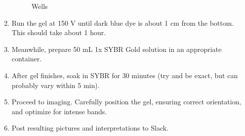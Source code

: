 \documentclass[letterpaper]{article}
\begin{document}
\begin{enumerate}
\begin{figure}[ht] %
\begin{center} 
\label{tab:Gel Layout} %
\caption{Wells} %
\end{center}
\end{figure}

\item{Run the gel at 150 V until dark blue dye is about 1 cm from the bottom. This should take about 1 hour.}
\item{Meanwhile, prepare 50 mL 1x SYBR Gold solution in an appropriate container.}
\item{After gel finishes, soak in SYBR for 30 minutes (try and be exact, but can probably vary within 5 min).}
\item{Proceed to imaging. Carefully position the gel, ensuring correct orientation, and optimize for intense bands.}
\item{Post resulting pictures and interpretations to Slack.}
\end{enumerate}
\end{document}
